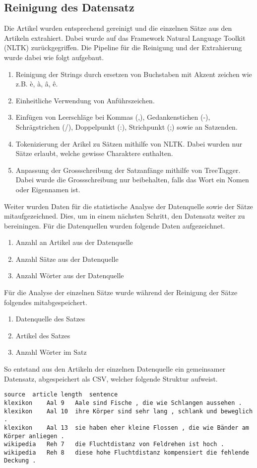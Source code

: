\subsection{Reinigung des Datensatz}
\label{sub:reinigung_des_datensatz}
Die Artikel wurden entsprechend gereinigt und die einzelnen Sätze aus den Artikeln extrahiert. Dabei wurde auf das
Framework Natural Language Toolkit (NLTK) zurückgegriffen. Die Pipeline für die Reinigung und der Extrahierung wurde
dabei wie folgt aufgebaut.
\newline
\begin{enumerate}
	\setlength\itemsep{0em}
	\item Reinigung der Strings durch ersetzen von Buchstaben mit Akzent zeichen wie z.B. è, à, â, ê.
	\item Einheitliche Verwendung von Anführszeichen.
	\item Einfügen von Leerschläge bei Kommas (,), Gedankenstichen (-), Schrägstrichen (/), Doppelpunkt (:), Strichpunkt
	(;) sowie an Satzenden.
	\item Tokenizierung der Arikel zu Sätzen mithilfe von NLTK. Dabei wurden nur Sätze erlaubt, welche gewisse Charaktere
	enthalten.
	\item Anpassung der Grossschreibung der Satzanfänge mithilfe von TreeTagger. Dabei wurde die Grossschreibung nur beibehalten, falls das Wort
    ein Nomen oder Eigennamen ist.
\end{enumerate}
\noindent
Weiter wurden Daten für die statistische Analyse der Datenquelle sowie der Sätze mitaufgezeichned. Dies, um in einem
nächsten Schritt, den Datensatz weiter zu bereiningen. Für die Datenquellen wurden folgende Daten aufgezeichnet.
\begin{enumerate}
    \setlength\itemsep{0em}
    \item Anzahl an Artikel aus der Datenquelle
    \item Anzahl Sätze aus der Datenquelle
    \item Anzahl Wörter aus der Datenquelle
\end{enumerate}
\noindent
Für die Analyse der einzelnen Sätze wurde während der Reinigung der Sätze folgendes mitabgespeichert.
\begin{enumerate}
    \setlength\itemsep{0em}
    \item Datenquelle des Satzes
    \item Artikel des Satzes
    \item Anzahl Wörter im Satz
\end{enumerate}
\noindent
So entstand aus den Artikeln der einzelnen Datenquelle ein gemeinsamer Datensatz, abgespeichert als CSV, welcher
folgende Struktur aufweist.
\begin{verbatim}
source	article	length	sentence
klexikon	Aal	9	Aale sind Fische , die wie Schlangen aussehen .
klexikon	Aal	10	ihre Körper sind sehr lang , schlank und beweglich .
klexikon	Aal	13	sie haben eher kleine Flossen , die wie Bänder am Körper anliegen .
wikipedia	Reh	7	die Fluchtdistanz von Feldrehen ist hoch .
wikipedia	Reh	8	diese hohe Fluchtdistanz kompensiert die fehlende Deckung .
\end{verbatim}


